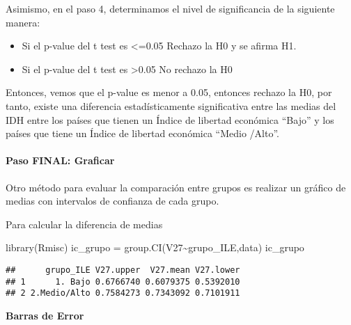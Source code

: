 \documentclass[
]{article}
\newenvironment{Shaded}{\begin{snugshade}}{\end{snugshade}}
\newcommand{\FunctionTok}[1]{\textcolor[rgb]{0.00,0.00,0.00}{#1}}
\newcommand{\NormalTok}[1]{#1}
\newcommand{\OtherTok}[1]{\textcolor[rgb]{0.56,0.35,0.01}{#1}}
\newcommand{\SpecialCharTok}[1]{\textcolor[rgb]{0.00,0.00,0.00}{#1}}
\begin{document}
Asimismo, en el paso 4, determinamos el nivel de significancia de la
siguiente manera:

\begin{itemize}
\item
  Si el p-value del t test es \textless=0.05 Rechazo la H0 y se afirma
  H1.
\item
  Si el p-value del t test es \textgreater0.05 No rechazo la H0
\end{itemize}

Entonces, vemos que el p-value es menor a 0.05, entonces rechazo la H0,
por tanto, existe una diferencia estadísticamente significativa entre
las medias del IDH entre los países que tienen un Índice de libertad
económica ``Bajo'' y los países que tiene un Índice de libertad
económica ``Medio /Alto''.

\hypertarget{paso-final-graficar}{%
\paragraph{\texorpdfstring{\textbf{Paso FINAL:
Graficar}}{Paso FINAL: Graficar}}\label{paso-final-graficar}}

Otro método para evaluar la comparación entre grupos es realizar un
gráfico de medias con intervalos de confianza de cada grupo.

Para calcular la diferencia de medias

\begin{Shaded}
\begin{Highlighting}[]
\FunctionTok{library}\NormalTok{(Rmisc)}
\NormalTok{ic\_grupo }\OtherTok{=} \FunctionTok{group.CI}\NormalTok{(V27}\SpecialCharTok{\textasciitilde{}}\NormalTok{grupo\_ILE,data)}
\NormalTok{ic\_grupo}
\end{Highlighting}
\end{Shaded}

\begin{verbatim}
##      grupo_ILE V27.upper  V27.mean V27.lower
## 1      1. Bajo 0.6766740 0.6079375 0.5392010
## 2 2.Medio/Alto 0.7584273 0.7343092 0.7101911
\end{verbatim}

\textbf{Barras de Error}
\end{document}
